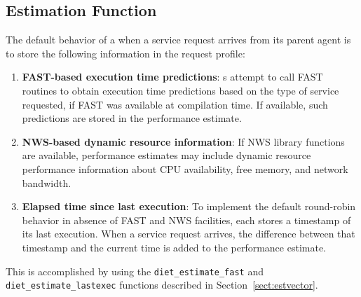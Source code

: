 \subsection{Estimation Function}\label{sect:est_fn}

The default behavior of a {\sed} when a service request arrives from its parent
agent is to store the following information in the request profile:
\begin{enumerate}
\item \textbf{FAST-based execution time predictions}: \diet {\sed}s attempt to
  call FAST routines to obtain execution time predictions based on the type of
  service requested, if FAST was available at compilation time.  If available,
  such predictions are stored in the performance estimate.
\item \textbf{NWS-based dynamic resource information}: If NWS library functions
  are available, performance estimates may include dynamic resource performance
  information about CPU availability, free memory, and network bandwidth.
\item \textbf{Elapsed time since last execution}: To implement the default
  round-robin behavior in absence of FAST and NWS facilities, each {\sed}
  stores a timestamp of its last execution.  When a service request arrives,
  the difference between that timestamp and the current time is added to the
  performance estimate.
\end{enumerate}
This is accomplished by using the \texttt{diet\_estimate\_fast} and
\texttt{diet\_estimate\_lastexec} functions described in
Section~\ref{sect:estvector}.

